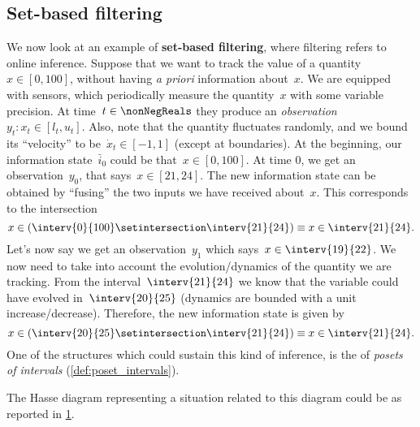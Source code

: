 \subsection{Set-based filtering}
We now look at an example of \textbf{set-based filtering}, where filtering refers to online inference.
Suppose that we want to track the value of a quantity~$x\in [0,100]$, without having \emph{a priori} information about~$x$.
We are equipped with sensors, which periodically measure the quantity~$x$ with some variable precision.
At time~$t\in \nonNegReals $ they produce an \emph{observation}~$y_t\colon x_t\in [l_t,u_t]$.
Also, note that the quantity fluctuates randomly, and we bound its ``velocity'' to be~$\dot{x}_t\in [-1,1]$ (except at boundaries).
At the beginning, our information state~$\bar{i}_0$ could be that~$x\in [0,100]$.
At time 0, we get an observation~$y_0$, that says~$x\in [21,24]$.
The new information state can be obtained by ``fusing'' the two inputs we have received about~$x$.
This corresponds to the intersection
\begin{equation*}
	x\in \left( \interv{0}{100} \setintersection \interv{21}{24}\right)\equiv x\in \interv{21}{24}.
\end{equation*}
Let's now say we get an observation~$y_1$ which says~$x\in \interv{19}{22}$.
We now need to take into account the evolution/dynamics of the quantity we are tracking.
From the interval~$\interv{21}{24}$ we know that the variable could have evolved in~$\interv{20}{25}$ (dynamics are bounded with a unit increase/decrease).
Therefore, the new information state is given by
\begin{equation*}
	x\in \left( \interv{20}{25} \setintersection \interv{21}{24}\right)\equiv x\in \interv{21}{24}.
\end{equation*}
One of the structures which could sustain this kind of inference, is the of \emph{posets of intervals} (\cref{def:poset_intervals}).

The Hasse diagram representing a situation related to this diagram could be as reported in \cref{fig:hasse_filtering}.
\begin{figure}[h!]
	\centering
	\caption{}
	\label{fig:hasse_filtering}
\end{figure}
